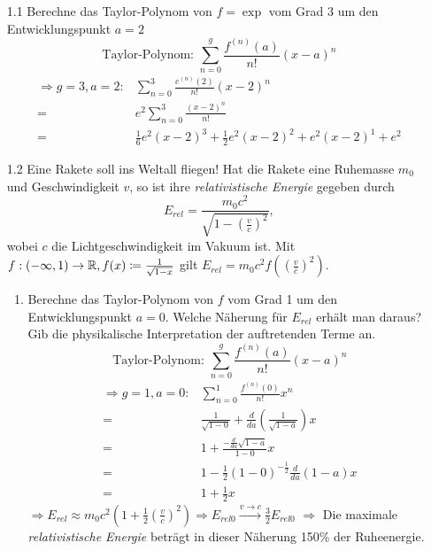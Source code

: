 \documentclass{HM}
\begin{document}
	\begin{enumerate}
		\item[1.1] Berechne das Taylor-Polynom von $f=\exp$ vom Grad 3 um den Entwicklungspunkt $a=2$
		 $$\text{Taylor-Polynom: }\sum\limits_{n=0}^g\frac{f^{(n)}(a)}{n!}(x-a)^n$$
		 \begin{align*}
		 	\Rightarrow g=3, a=2: 
		 	&\sum\limits_{n=0}^3\frac{e^{(n)}(2)}{n!}(x-2)^n\\
		 	=&e^2\sum\limits_{n=0}^3\frac{(x-2)^n}{n!}\\
		 	=&\frac{1}{6}e^2(x-2)^3+\frac{1}{2}e^2(x-2)^2+e^2(x-2)^1+e^2
		 \end{align*}
		 
		 \item[1.2] Eine Rakete soll ins Weltall fliegen! Hat die Rakete eine Ruhemasse $m_0$ und Geschwindigkeit $v$, so ist ihre \textit{relativistische Energie} gegeben durch
		 $$E_{rel}=\frac{m_0c^2}{\sqrt{1-(\frac{v}{c})^2}},$$
		 wobei $c$ die Lichtgeschwindigkeit im Vakuum ist. Mit $f: (-\infty,1)\to\mathbb{R}, f(x)\coloneqq\frac{1}{\sqrt{1-x}}$ gilt $E_{rel}=m_0c^2f((\frac{v}{c})^2)$.
		 \begin{enumerate}
		 	\item Berechne das Taylor-Polynom von $f$ vom Grad 1 um den Entwicklungspunkt $a=0$. Welche Näherung für $E_{rel}$ erhält man daraus? Gib die physikalische Interpretation der auftretenden Terme an.
		 	$$\text{Taylor-Polynom: }\sum\limits_{n=0}^g\frac{f^{(n)}(a)}{n!}(x-a)^n$$
		 	\begin{align*}
		 		\Rightarrow g=1, a=0:
		 		&\sum\limits_{n=0}^1\frac{f^{(n)}(0)}{n!}x^n\\
		 		=&\frac{1}{\sqrt{1-0}}+\frac{d}{da}\left(\frac{1}{\sqrt{1-a}}\right)x\\
		 		=&1+\frac{-\frac{d}{da}\sqrt{1-a}}{1-0}x\\
		 		=&1-\frac{1}{2}(1-0)^{-\frac{1}{2}}\frac{d}{da}(1-a)x\\
		 		=&1+\frac{1}{2}x
			\end{align*}
			$\Rightarrow E_{rel}\approx m_0c^2(1+\frac{1}{2}(\frac{v}{c})^2) \Rightarrow E_{rel0}\xrightarrow{v\to c}\frac{3}{2}E_{rel0}$
			$\Rightarrow$ Die maximale \textit{relativistische Energie} beträgt in dieser Näherung 150\% der Ruheenergie.
		 	

\end{enumerate}
\end{enumerate}
\end{document}
